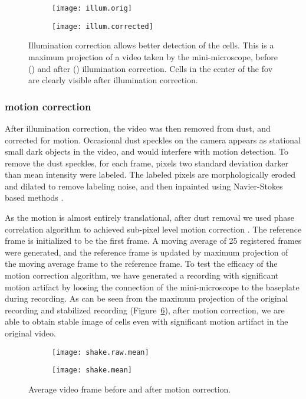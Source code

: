 \begin{figure}[h]
    \begin{subfigure}[t]{.5\textwidth}
        \centering
        \texttt{[image: illum.orig]}
        \caption{\label{illum.orig}}
    \end{subfigure}
    \begin{subfigure}[t]{.5\textwidth}
        \centering
        \texttt{[image: illum.corrected]}
        \caption{\label{illum.corrected}}
    \end{subfigure}
    \caption{Illumination correction allows better detection of the cells. This is a maximum projection of a video taken by the mini-microscope, before () and after () illumination correction. Cells in the center of the \gls{fov} are clearly visible after illumination correction. \label{f.illumination}}
\end{figure}

\subsubsection{motion correction}
After illumination correction, the video was then removed from dust, and corrected for motion. Occasional dust speckles on the camera appears as stational small dark objects in the video, and would interfere with motion detection. To remove the dust speckles, for each frame, pixels two standard deviation darker than mean intensity were labeled. The labeled pixels are morphologically eroded and dilated to remove labeling noise, and then inpainted using Navier-Stokes based methods \citep{bertalmio01}.

As the motion is almost entirely translational, after dust removal we used phase correlation algorithm to achieved sub-pixel level motion correction \citep{guizar08}. The reference frame is initialized to be the first frame. A moving average of 25 registered frames were generated, and the reference frame is updated by maximum projection of the moving average frame to the reference frame. To test the efficacy of the motion correction algorithm, we have generated a recording with significant motion artifact by loosing the connection of the mini-microscope to the baseplate during recording. As can be seen from the maximum projection of the original recording and stabilized recording (Figure~\ref{f.motion}), after motion correction, we are able to obtain stable image of cells even with significant motion artifact in the original video.
\begin{figure}[h]
    \begin{subfigure}[t]{.5\textwidth}
        \centering
        \texttt{[image: shake.raw.mean]}
        \caption{\label{motion.orig}}
    \end{subfigure}
    \begin{subfigure}[t]{.5\textwidth}
        \centering
        \texttt{[image: shake.mean]}
        \caption{\label{motion.corrected}}
    \end{subfigure}
    \caption{Average video frame before and after motion correction. \label{f.motion}}
\end{figure}


